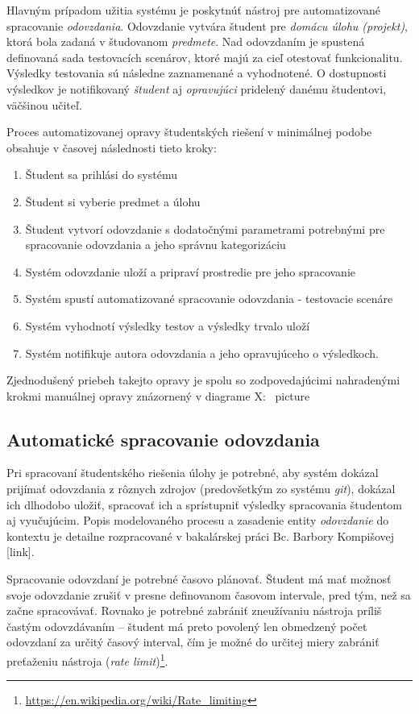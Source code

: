 \documentclass[
  digital, %
  twoside, %
  table,   %
  lof,     %
  lot,     %
]{fithesis3}
\begin{document}
Hlavným prípadom užitia systému je poskytnúť nástroj pre automatizované spracovanie \emph{odovzdania}. Odovzdanie vytvára študent pre \emph{domácu úlohu (projekt)}, ktorá bola zadaná v študovanom \emph{predmete}. Nad odovzdaním je spustená definovaná sada testovacích scenárov, ktoré majú za cieľ otestovať funkcionalitu. Výsledky testovania sú následne zaznamenané a vyhodnotené. O dostupnosti výsledkov je notifikovaný \emph{študent} aj \emph{opravujúci} pridelený danému študentovi, väčšinou učiteľ.

Proces automatizovanej opravy študentských riešení v minimálnej podobe obsahuje v časovej následnosti tieto kroky:
\begin{enumerate}
    \item Študent sa prihlási do systému
    \item Študent si vyberie predmet a úlohu
    \item Študent vytvorí odovzdanie s dodatočnými parametrami potrebnými pre spracovanie odovzdania a jeho správnu kategorizáciu
    \item Systém odovzdanie uloží a pripraví prostredie pre jeho spracovanie
    \item Systém spustí automatizované spracovanie odovzdania - testovacie scenáre
    \item Systém vyhodnotí výsledky testov a výsledky trvalo uloží
    \item Systém notifikuje autora odovzdania a jeho opravujúceho o výsledkoch.
\end{enumerate}

Zjednodušený priebeh takejto opravy je spolu so zodpovedajúcimi nahradenými krokmi manuálnej opravy znázornený v diagrame X:
\ picture


\subsection{Automatické spracovanie odovzdania}

Pri spracovaní študentského riešenia úlohy je potrebné, aby systém dokázal prijímať odovzdania z rôznych zdrojov (predovšetkým zo systému \emph{git}), dokázal ich dlhodobo uložiť, spracovať ich a sprístupniť výsledky spracovania študentom aj vyučujúcim. Popis modelovaného procesu a zasadenie entity \textit{odovzdanie} do kontextu je detailne rozpracované v bakalárskej práci Bc. Barbory Kompišovej [link].

Spracovanie odovzdaní je potrebné časovo plánovať. Študent má mať možnosť svoje odovzdanie zrušiť v presne definovanom časovom intervale, pred tým, než sa začne spracovávať. Rovnako je potrebné zabrániť zneužívaniu nástroja príliš častým odovzdávaním -- študent má preto povolený len obmedzený počet odovzdaní za určitý časový interval, čím je možné do určitej miery zabrániť preťaženiu nástroja (\emph{rate limit})\footnote{\url{https://en.wikipedia.org/wiki/Rate_limiting}}.
\end{document}
